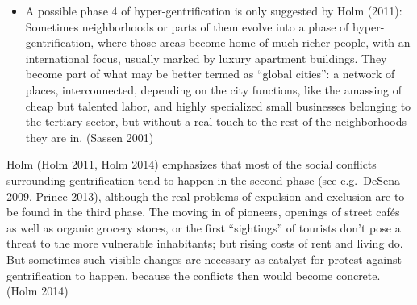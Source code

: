 \documentclass[a4paper,
fontsize=11pt,
oneside,
numbers=noperiodatend,
parskip=half-,
bibliography=totoc,
final
]{scrartcl}
\begin{document}
\begin{itemize}
  lifestyles, most of those have vanished or have been incorporated into
  the picture of the neighborhood, without being actually
  lived.\footnote{Hae (2012) analyzed those contradictory changes in New
    York nightlife, when parts of the city moved from the second to the
    third phase of gentrification and described it as a process of
    becoming \enquote{boring} (DeSena 2009), while still trying to
    profit from the picture of a highly vitalized city life fostered in
    the first and second phase: \enquote{As the city has experienced
    gentrification throughout the last three decades, \enquote{noisy}
    and \enquote{boisterous} nightlife businesses in gentrifying
    neighborhoods, including bars and lounges as well as dance clubs,
    have been censured as the number one enemy of \enquote{quality of
    life} in these neighborhoods due to their nuisance effects.
    Ironically, this process has gone on even as the real estate sector
    trumpeted and marketed the profile of nightlife in these communities
    as a sign of neighborhood vibrancy in order to boost property
    values. That is, nightlife establishments and their cultural
    elements have been one of the important catalysts for gentrification
    of the very neighborhoods in which the presence of these businesses,
    later, have been intensely contested by groups of gentry that have
    moved here.} (Hae 2012, 2)}
\item
  A possible phase 4 of hyper-gentrification is only suggested by Holm
  (2011): Sometimes neighborhoods or parts of them evolve into a phase
  of hyper-gentrification, where those areas become home of much richer
  people, with an international focus, usually marked by luxury
  apartment buildings. They become part of what may be better termed as
  \enquote{global cities}: a network of places, interconnected,
  depending on the city functions, like the amassing of cheap but
  talented labor, and highly specialized small businesses belonging to
  the tertiary sector, but without a real touch to the rest of the
  neighborhoods they are in. (Sassen 2001)
\end{itemize}

Holm (Holm 2011, Holm 2014) emphasizes that most of the social conflicts
surrounding gentrification tend to happen in the second phase (see
e.g.~DeSena 2009, Prince 2013), although the real problems of expulsion
and exclusion are to be found in the third phase. The moving in of
pioneers, openings of street cafés as well as organic grocery stores, or
the first \enquote{sightings} of tourists don't pose a threat to the
more vulnerable inhabitants; but rising costs of rent and living do. But
sometimes such visible changes are necessary as catalyst for protest
against gentrification to happen, because the conflicts then would
become concrete. (Holm 2014)
\end{document}
